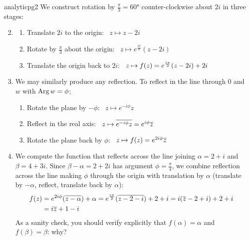 \begin{examples}{}{analyticpg2}
	\exstart We construct rotation by $\frac\pi 3=\ang{60}$ counter-clockwise about $2i$ in three stages:
	\begin{enumerate}\setcounter{enumi}{1}
	  \item[]\begin{enumerate}
	  	\item Translate $2i$ to the origin: \ $z\mapsto z-2i$
	  	\item Rotate by $\frac\pi 3$ about the origin: \ $z\mapsto e^{\frac{i\pi}3}(z-2i)$
	  	\item Translate the origin back to $2i$: \ $z\mapsto f(z) =e^{\frac{i\pi}{3}}(z-2i)+2i$
		\end{enumerate}
	  
		\item We may similarly produce any reflection. To reflect in the line through 0 and $w$ with $\operatorname{Arg} w=\phi$;
		\begin{enumerate}
		  \item Rotate the plane by $-\phi$: \ $z\mapsto e^{-i\phi}z$
		  \item Reflect in the real axis: \ $z\mapsto \overline{e^{-i\phi}z}=e^{i\phi}\overline{z}$
		  \item Rotate the plane back by $\phi$: \ $z\mapsto f(z)=e^{2i\phi}\overline{z}$
		\end{enumerate}
	  
	  \item\label{ex:reflect2} We compute the function that reflects across the line joining $\alpha=2+i$ and $\beta=4+3i$.\smallbreak
	  Since $\beta-\alpha=2+2i$ has argument $\phi=\frac\pi 4$, we combine reflection across the line making $\phi$ through the origin with translation by $\alpha$ (translate by $-\alpha$, reflect, translate back by $\alpha$):
	  \begin{align*}
		  f(z)&=e^{2i\phi}(\overline{z-\alpha})+\alpha =e^{\frac{i\pi}{2}}(\overline{z-2-i})+2+i=i(\overline{z}-2+i)+2+i\\
		  &=i\overline{z}+1-i
	  \end{align*}
	  As a sanity check, you should verify explicitly that $f(\alpha)=\alpha$ and $f(\beta)=\beta$: why?
	\end{enumerate}
\end{examples}


